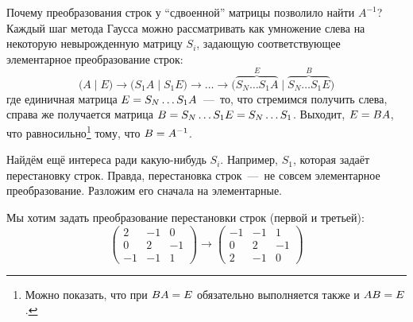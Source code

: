 \documentclass[a4paper,12pt]{article}
\theoremstyle{remark}
\begin{document}
\begin{solution}
    Почему преобразования строк у ``сдвоенной'' матрицы позволило найти $A^{-1}$?
    Каждый шаг метода Гаусса можно рассматривать как умножение слева на некоторую невырожденную матрицу $S_i$, задающую соответствующее элементарное преобразование строк:
    \[
      \bigl(A \mid E\bigr) \to \bigl(S_1 A \mid S_1 E\bigr) \to \ldots
      \to \bigl(\overbrace{S_N \ldots S_1 A}^{E} \mid \overbrace{S_N \ldots S_1 E}^{B}\bigr)
    \]
    где единичная матрица $E \hm= S_N \ldots S_1 A$~---~то, что стремимся получить слева, справа же получается матрица $B \hm= S_N \ldots S_1 E \hm= S_N \ldots S_1$.
    Выходит, $E \hm= BA$, что равносильно\footnote{Можно показать, что при $BA \hm= E$ обязательно выполняется также и $AB \hm= E$.} тому, что $B \hm= A^{-1}$.
    
    \medskip
    
    Найдём ещё интереса ради какую-нибудь $S_i$.
    Например, $S_1$, которая задаёт перестановку строк.
    Правда, перестановка строк~---~не совсем элементарное преобразование.
    Разложим его сначала на элементарные.
    
    Мы хотим задать преобразование перестановки строк (первой и третьей):
    \[
      \begin{pmatrix}
        2 & -1 & 0\\
        0 & 2 & -1\\
        -1 & -1 & 1
      \end{pmatrix}
      \longrightarrow \begin{pmatrix}
        -1 & -1 & 1\\
        0 & 2 & -1\\
        2 & -1 & 0
      \end{pmatrix}
    \]
    

\end{solution}
\end{document}
